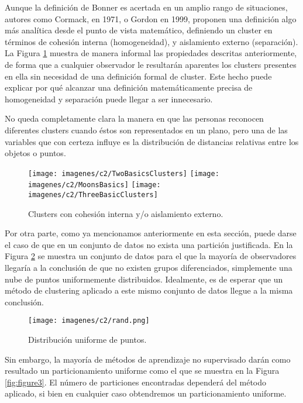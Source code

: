 Aunque la definición de Bonner es acertada en un amplio rango de situaciones, autores como Cormack, en 1971, o Gordon en 1999, proponen una definición algo más analítica desde el punto de vista matemático, definiendo un cluster en términos de cohesión interna (homogeneidad), y aislamiento externo (separación). La Figura \ref{fig:figure1} muestra de manera informal las propiedades descritas anteriormente, de forma que a cualquier observador le resultarán aparentes los clusters presentes en ella sin necesidad de una definición formal de cluster. Este hecho puede explicar por qué alcanzar una definición matemáticamente precisa de homogeneidad y separación puede llegar a ser innecesario.

No queda completamente clara la manera en que las personas reconocen diferentes clusters cuando éstos son representados en un plano, pero una de las variables que con certeza influye es la distribución de distancias relativas entre los objetos o puntos.

\clearpage

\begin{figure}[bth]
	\myfloatalign
	{\texttt{[image: imagenes/c2/TwoBasicsClusters]}}
	{\texttt{[image: imagenes/c2/MoonsBasics]}}
	{\texttt{[image: imagenes/c2/ThreeBasicClusters]}}
	\caption[Clusters con cohesión interna y/o aislamiento externo]{Clusters con cohesión interna y/o aislamiento externo.}\label{fig:figure1}
\end{figure}

Por otra parte, como ya mencionamos anteriormente en esta sección, puede darse el caso de que en un conjunto de datos no exista una partición justificada. En la Figura \ref{fig:figure2} se muestra un conjunto de datos para el que la mayoría de observadores llegaría a la conclusión de que no existen grupos diferenciados, simplemente una nube de puntos uniformemente distribuidos. Idealmente, es de esperar que un método de clustering aplicado a este mismo conjunto de datos llegue a la misma conclusión.

\begin{figure}[!h]
	\centering
	\texttt{[image: imagenes/c2/rand.png]} 
	\caption{Distribución uniforme de puntos.}\label{fig:figure2}
\end{figure}

Sin embargo, la mayoría de métodos de aprendizaje no supervisado darán como resultado un particionamiento uniforme como el que se muestra en la Figura \ref{fig:figure3}. El número de particiones encontradas dependerá del método aplicado, si bien en cualquier caso obtendremos un particionamiento uniforme.

